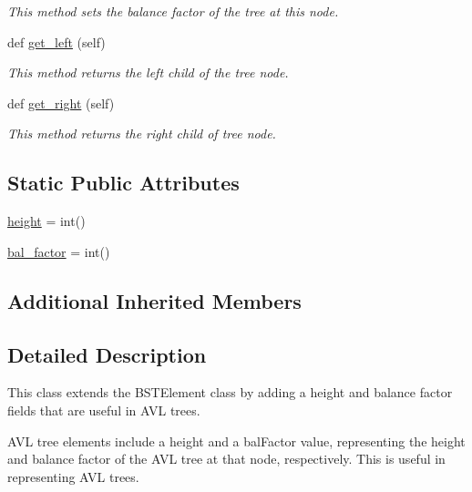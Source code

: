 \begin{DoxyCompactItemize}
\begin{DoxyCompactList}\small\item\em This method sets the balance factor of the tree at this node. \end{DoxyCompactList}\item 
def \mbox{\hyperlink{classbridges_1_1avl__tree__element_1_1_a_v_l_tree_element_af36a21b621dd4aab6cf7dd041058f9e7}{get\+\_\+left}} (self)
\begin{DoxyCompactList}\small\item\em This method returns the left child of the tree node. \end{DoxyCompactList}\item 
def \mbox{\hyperlink{classbridges_1_1avl__tree__element_1_1_a_v_l_tree_element_ac1be8fd466c3aa5d278c4ddc01d2019d}{get\+\_\+right}} (self)
\begin{DoxyCompactList}\small\item\em This method returns the right child of tree node. \end{DoxyCompactList}\end{DoxyCompactItemize}
\subsection*{Static Public Attributes}
\begin{DoxyCompactItemize}
\item 
\mbox{\hyperlink{classbridges_1_1avl__tree__element_1_1_a_v_l_tree_element_a83590431488989ab3143e69c5fc2deb3}{height}} = int()
\item 
\mbox{\hyperlink{classbridges_1_1avl__tree__element_1_1_a_v_l_tree_element_a9bc19a93645da2c30d029315dcce1d09}{bal\+\_\+factor}} = int()
\end{DoxyCompactItemize}
\subsection*{Additional Inherited Members}


\subsection{Detailed Description}
This class extends the B\+S\+T\+Element class by adding a height and balance factor fields that are useful in A\+VL trees. 

A\+VL tree elements include a \textquotesingle{}height\textquotesingle{} and a \textquotesingle{}bal\+Factor\textquotesingle{} value, representing the height and balance factor of the A\+VL tree at that node, respectively. This is useful in representing A\+VL trees.

